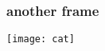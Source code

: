 \documentclass[main.tex]{subfiles}
\begin{document}
  \begin{frame}
    \frametitle{another frame}
    \texttt{[image: cat]}
  \end{frame}
\end{document}
